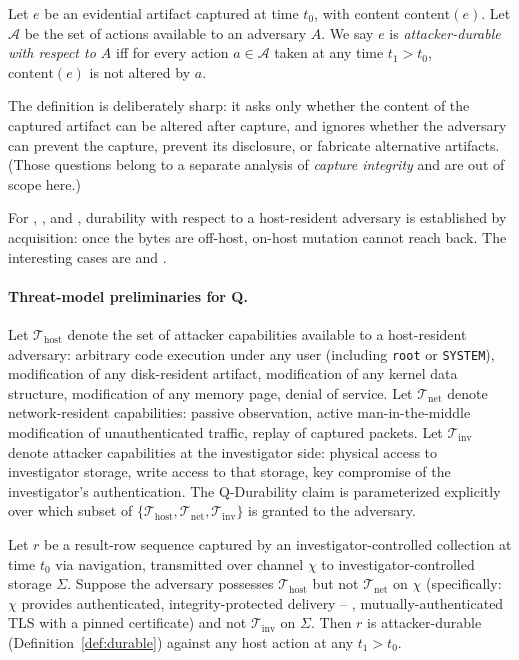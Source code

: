 \begin{definition}
\label{def:durable}
Let $e$ be an evidential artifact captured at time $t_0$, with content
$\mathrm{content}(e)$. Let $\mathcal{A}$ be the set of actions available
to an adversary $A$. We say $e$ is \emph{attacker-durable with respect to
$A$} iff for every action $a \in \mathcal{A}$ taken at any time $t_1 > t_0$,
$\mathrm{content}(e)$ is not altered by $a$.
\end{definition}

The definition is deliberately sharp: it asks only whether the content of
the captured artifact can be altered after capture, and ignores whether the
adversary can prevent the capture, prevent its disclosure, or fabricate
alternative artifacts. (Those questions belong to a separate analysis of
\emph{capture integrity} and are out of scope here.)

For , , and , durability with respect to a host-resident
adversary is established by acquisition: once the bytes are off-host, on-host
mutation cannot reach back. The interesting cases are  and .

\paragraph{Threat-model preliminaries for Q.} Let $\mathcal{T}_{\mathrm{host}}$
denote the set of attacker capabilities available to a host-resident
adversary: arbitrary code execution under any user (including \texttt{root}
or \texttt{SYSTEM}), modification of any disk-resident artifact,
modification of any kernel data structure, modification of any memory
page, denial of service. Let $\mathcal{T}_{\mathrm{net}}$ denote
network-resident capabilities: passive observation, active
man-in-the-middle modification of unauthenticated traffic, replay of
captured packets. Let $\mathcal{T}_{\mathrm{inv}}$ denote attacker
capabilities at the investigator side: physical access to investigator
storage, write access to that storage, key compromise of the investigator's
authentication. The Q-Durability claim is parameterized explicitly over
which subset of $\{\mathcal{T}_{\mathrm{host}}, \mathcal{T}_{\mathrm{net}},
\mathcal{T}_{\mathrm{inv}}\}$ is granted to the adversary.

\begin{proposition}
\label{prop:q-durability}
Let $r$ be a result-row sequence captured by an investigator-controlled
collection at time $t_0$ via  navigation, transmitted over channel
$\chi$ to investigator-controlled storage $\Sigma$. Suppose the adversary
possesses $\mathcal{T}_{\mathrm{host}}$ but not $\mathcal{T}_{\mathrm{net}}$
on $\chi$ (specifically: $\chi$ provides authenticated, integrity-protected
delivery -- \eg{}, mutually-authenticated TLS with a pinned certificate)
and not $\mathcal{T}_{\mathrm{inv}}$ on $\Sigma$. Then $r$ is
attacker-durable (Definition~\ref{def:durable}) against any host action at
any $t_1 > t_0$.
\end{proposition}

